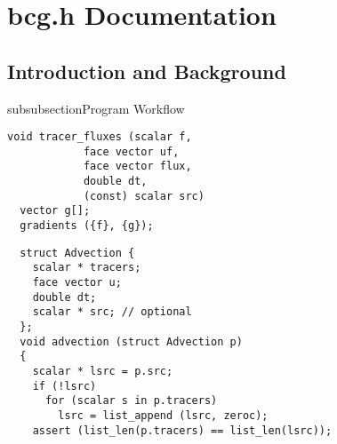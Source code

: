\chapter{bcg.h Documentation}
\chaptermeta[1.0][2025-01-01]
\section{Introduction and Background}\label{sec:fractions-intro}

\begin{codesection}{subsubsection}{Program Workflow}

\begin{verbatim}
void tracer_fluxes (scalar f,
		    face vector uf,
		    face vector flux,
		    double dt,
		    (const) scalar src)
  vector g[];
  gradients ({f}, {g});
\end{verbatim}

\codearrow


\begin{verbatim}
  struct Advection {
    scalar * tracers;
    face vector u;
    double dt;
    scalar * src; // optional
  };
  void advection (struct Advection p)
  {
    scalar * lsrc = p.src;
    if (!lsrc)
      for (scalar s in p.tracers)
        lsrc = list_append (lsrc, zeroc);
    assert (list_len(p.tracers) == list_len(lsrc));
\end{verbatim}

\end{codesection}
  